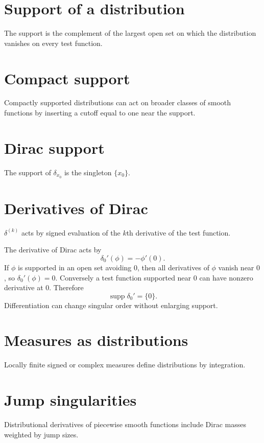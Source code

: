 \section{Support of a distribution}
The support is the complement of the largest open set on which the distribution vanishes on every test function.

\section{Compact support}
Compactly supported distributions can act on broader classes of smooth functions by inserting a cutoff equal to one near the support.

\section{Dirac support}
The support of $\delta_{x_0}$ is the singleton $\{x_0\}$.

\section{Derivatives of Dirac}
$\delta^{(k)}$ acts by signed evaluation of the $k$th derivative of the test function.


\begin{example}\label{ex:iii17-expand-01}
The derivative of Dirac acts by
\[
\delta_0'(\phi)=-\phi'(0).
\]
If \(\phi\) is supported in an open set avoiding \(0\), then all derivatives
of \(\phi\) vanish near \(0\), so \(\delta_0'(\phi)=0\). Conversely a test
function supported near \(0\) can have nonzero derivative at \(0\). Therefore
\[
\operatorname{supp}\delta_0'=\{0\}.
\]
Differentiation can change singular order without enlarging support.
\end{example}
\section{Measures as distributions}
Locally finite signed or complex measures define distributions by integration.

\section{Jump singularities}
Distributional derivatives of piecewise smooth functions include Dirac masses weighted by jump sizes.


